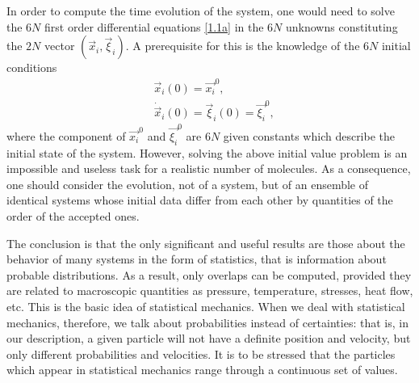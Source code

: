 In order to compute the time evolution of the system, one would need to solve the \(6N\) first order differential equations \eqref{1.1a} in the \(6N\) unknowns constituting the \(2N\) vector \((\vec{x}_i, \vec{\xi}_i)\). A prerequisite for this is the knowledge of the \(6N\) initial conditions
\begin{equation}
    \begin{aligned}
        &\vec{x}_i(0) = \vec{x_i}^0, \\
        &\dot{\vec{x}}_i(0) = \vec{\xi}_i(0) = \vec{\xi_i}^0,
    \end{aligned} 
    \label{1.2}
\end{equation}
where the component of \(\vec{x_i}^0\) and \(\vec{\xi_i}^0\) are \(6N\) given constants which describe the initial state of the system. However, solving the above initial value problem is an impossible and useless task for a realistic number of molecules. As a consequence, one should consider the evolution, not of a system, but of an ensemble of identical systems whose initial data differ from each other by quantities of the order of the accepted ones. 

The conclusion is that the only significant and useful results are those about the behavior of many systems in the form of statistics, that is information about probable distributions. As a result, only overlaps can be computed, provided they are related to macroscopic quantities as pressure, temperature, stresses, heat flow, etc. This is the basic idea of statistical mechanics. When we deal with statistical mechanics, therefore, we talk about probabilities instead of certainties: that is, in our description, a given particle will not have a definite position and velocity, but only different probabilities and velocities. It is to be stressed that the particles which appear in statistical mechanics range through a continuous set of values. 

